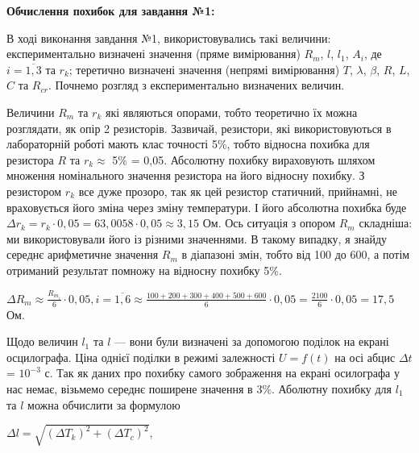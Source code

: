 \documentclass[12pt,a4paper]{article}
\begin{document}
    \vspace{1em} %

    \textbf{\large Обчислення похибок для завдання №1:}

    \vspace{1em} %
    \setlength{\parindent}{1.5em}

    В ході виконання завдання №1, використовувались такі величини: експериментально визначені значення (пряме вимірювання) $R_m$, $l$, $l_1$, $A_i$, де $i = \overline{1, 3}$ та $r_k$;
    теретично визначені значення (непрямі вимірювання) $T$, $\lambda$, $\beta$, $R$, $L$, $C$ та $R_{cr}$. Почнемо розгляд з експериментально визначених величин.

    Величини $R_m$ та $r_k$ які являються опорами, тобто теоретично їх можна розглядати, як опір 2 резисторів. Зазвичай, резистори,
    які використовуються в лабораторній роботі мають клас точності 5\%, тобто відносна похибка для резистора $R$ та $r_k \approx$ 5\% = 0,05. Абсолютну похибку
    вираховують шляхом множення номінального значення резистора на його відносну похибку. З резистором $r_k$ все дуже прозоро, так як цей резистор статичний, прийнамні, не враховується його зміна через зміну температури.
    І його абсолютна похибка буде $\Delta r_k = r_k \cdot 0,05 = 63,0058 \cdot 0,05 \approx 3,15$ Ом. Ось ситуація з опором $R_m$ складніша: ми використовували його із різними значеннями.
    В такому випадку, я знайду середнє арифметичне значення $R_m$ в діапазоні змін, тобто від 100 до 600, а потім отриманий результат помножу на відносну похибку 5\%.

    \vspace{1em} %
    \setlength{\parindent}{0pt}

    $\displaystyle \Delta R_m \approx \frac{R_{m_i}}{6} \cdot 0,05, i = \overline{1, 6} \approx \frac{100 + 200 + 300 + 400 + 500 + 600}{6} \cdot 0,05 = \frac{2100}{6} \cdot 0,05 = 17,5$ Ом.

    \setlength{\parindent}{1.5em}

    Щодо величин $l_1$ та $l$ --- вони були визначені за допомогою поділок на екрані осцилографа. Ціна однієї поділки в режимі залежності $U = f(t)$ на осі абцис $\Delta t$ = $10^{-3}$ с. Так як даних про похибку
    самого зображення на екрані осилографа у нас немає, візьмемо середнє поширене значення в 3\%. Аболютну похибку для $l_1$ та $l$ можна обчислити за формулою

    \begin{center}
        $\displaystyle \Delta l = \sqrt{(\Delta T_k)^2 + (\Delta T_c)^2}$,
    \end{center}
\end{document}
